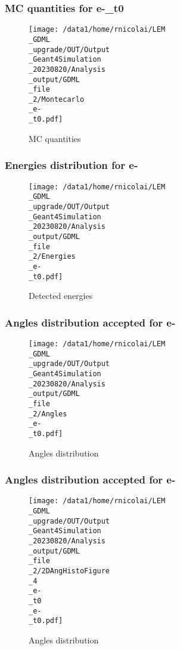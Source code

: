 \documentclass[8pt]{beamer}
\begin{document}
            \begin{frame}
                \frametitle{MC quantities for e-\_t0}
            
        \begin{figure}[h]
            \centering
            \texttt{[image: /data1/home/rnicolai/LEM\\\_GDML\\\_upgrade/OUT/Output\\\_Geant4Simulation\\\_20230820/Analysis\\\_output/GDML\\\_file\\\_2/Montecarlo\\\_e-\\\_t0.pdf]}
            \caption{MC quantities}
        \end{figure}
        
            \end{frame}
            
            \begin{frame}
                \frametitle{Energies distribution for e-}
            
        \begin{figure}[h]
            \centering
            \texttt{[image: /data1/home/rnicolai/LEM\\\_GDML\\\_upgrade/OUT/Output\\\_Geant4Simulation\\\_20230820/Analysis\\\_output/GDML\\\_file\\\_2/Energies\\\_e-\\\_t0.pdf]}
            \caption{Detected energies}
        \end{figure}
        
            \end{frame}
            
            \begin{frame}
                \frametitle{Angles distribution accepted for e-}
            
        \begin{figure}[h]
            \centering
            \texttt{[image: /data1/home/rnicolai/LEM\\\_GDML\\\_upgrade/OUT/Output\\\_Geant4Simulation\\\_20230820/Analysis\\\_output/GDML\\\_file\\\_2/Angles\\\_e-\\\_t0.pdf]}
            \caption{Angles distribution}
        \end{figure}
        
            \end{frame}
            
            \begin{frame}
                \frametitle{Angles distribution accepted for e-}
            
        \begin{figure}[h]
            \centering
            \texttt{[image: /data1/home/rnicolai/LEM\\\_GDML\\\_upgrade/OUT/Output\\\_Geant4Simulation\\\_20230820/Analysis\\\_output/GDML\\\_file\\\_2/2DAngHistoFigure\\\_4\\\_e-\\\_t0\\\_e-\\\_t0.pdf]}
            \caption{Angles distribution}
        \end{figure}
        
            \end{frame}
            
\end{document}
